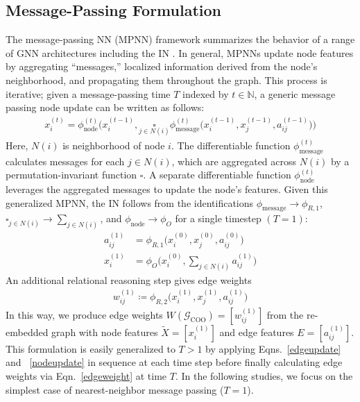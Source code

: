 \documentclass[twocolumn]{svjour3}
\begin{document}
\subsection{Message-Passing Formulation}\label{messagepassingformulation}
The message-passing NN (MPNN) framework summarizes the behavior of a range of GNN architectures including the IN \cite{gilmer2017neural}. 
In general, MPNNs update node features by aggregating ``messages,'' localized information derived from the node's neighborhood, and propagating them throughout the graph. 
This process is iterative; given a message-passing time $T$ indexed by $t\in\mathbb{N}$, a generic message passing node update can be written as follows: 
\begin{align}
    x^{(t)}_{i} = \phi_\mathrm{node}^{(t)}\bigg( x_i^{(t-1)}, \underset{j\in N(i)}{\square} \phi_\mathrm{message}^{(t)}\big(x_i^{(t-1)}, x_j^{(t-1)}, a_{ij}^{(t-1)} \big)  \bigg)
\end{align}
Here, $N(i)$ is neighborhood of node $i$. 
The differentiable function $\phi_\mathrm{message}^{(t)}$ calculates messages for each $j\in N(i)$, which are aggregated across $N(i)$ by a permutation-invariant function $\square$. 
A separate differentiable function $\phi_\mathrm{node}^{(t)}$ leverages the aggregated messages to update the node's features. 
Given this generalized MPNN, the IN follows from the identifications $\phi_\mathrm{message}\rightarrow \phi_{R,1}$, $\square_{j\in N(i)}\rightarrow \sum_{j\in N(i)}$, and $\phi_\mathrm{node}\rightarrow \phi_{O}$ for a single timestep $(T=1)$:
\begin{align}
    a_{ij}^{(1)} &= \phi_{R,1}\big(x_i^{(0)}, x_j^{(0)}, a_{ij}^{(0)} \big)\label{edgeupdate}\\
    x^{(1)}_{i} &= \phi_{O}\bigg(x_i^{(0)}, \underset{j\in N(i)}{\sum}a_{ij}^{(1)} \bigg)\label{nodeupdate}
\end{align}
An additional relational reasoning step gives edge weights
\begin{align}
    w_{ij}^{(1)} \coloneqq \phi_{R,2}\big(x_i^{(1)}, x_j^{(1)}, a_{ij}^{(1)}\big)\label{edgeweight}
\end{align}
In this way, we produce edge weights $W(\mathcal{G}_\mathrm{COO})=[w_{ij}^{(1)}]$ from the re-embedded graph with node features $\tilde{X}=[x_i^{(1)}]$ and edge features $E=[a_{ij}^{(1)}]$. This formulation is easily generalized to $T>1$ by applying Eqns.~\ref{edgeupdate} and ~\ref{nodeupdate} in sequence at each time step before finally calculating edge weights via Eqn.~\ref{edgeweight} at time $T$. In the following studies, we focus on the simplest case of nearest-neighbor message passing ($T=1$). 
\end{document}
